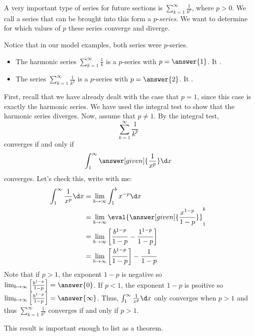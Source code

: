 \documentclass{ximera}
\begin{document}
A very important type of series for future sections is $\sum_{k=1}^\infty \frac{1}{k^p}$, where $p>0$.  We call a series that can be brought into this form a $p$-\emph{series}.  We want to determine for which values of $p$ these series converge and diverge.

Notice that in our model examples, both series were $p$-series.

\begin{itemize}
\item The harmonic series $\sum_{k=1}^{\infty} \frac{1}{k}$ is a $p$-series with $p = \answer{1}$.  It .
\item The series $\sum_{k=1}^{\infty} \frac{1}{k^2}$ is a $p$-series with $p = \answer{2}$. It .
\end{itemize}
  
 \begin{explanation}
    First, recall that we have already dealt with the case that $p = 1$, since 
    this case is exactly the harmonic series.  We have used the integral test 
    to show that the harmonic series diverges.
    Now, assume that $p \ne 1$.  By the integral test,
    \[
    \sum_{k=1}^\infty \frac{1}{k^p}
    \]
    converges if and only if
    \[
    \int_1^\infty \answer[given]{\frac{1}{x^p}} \d x
    \]
    converges. Let's check this, write with me:
    \begin{align*}
      \int_1^\infty \frac{1}{x^p} \d x &= \lim_{b\to\infty} \int_1^b x^{-p} \d x\\
      &= \lim_{b\to\infty} \eval{\answer[given]{\frac{x^{1-p}}{1-p}}}_1^b\\
      &= \lim_{b\to\infty} \left[ \frac{b^{1-p}}{1-p} - \frac{1^{1-p}}{1-p} \right] \\
      &= \lim_{b\to\infty} \left[\frac{b^{1-p}}{1-p}\right] - \frac{1}{1-p}
    \end{align*}
Note that if $p >1$, the exponent $1-p$ is negative so $ \lim_{b\to\infty} \left[\frac{b^{1-p}}{1-p}\right] = \answer{0}$.   If $p <1$, the exponent $1-p$ is psoitive so $ \lim_{b\to\infty} \left[\frac{b^{1-p}}{1-p}\right] = \answer{\infty}$.  Thus, $  \int_1^\infty \frac{1}{x^p} \d x$  only converges when $p>1$ and thus  $\sum_{k=1}^\infty \frac{1}{k^p}$ converges if and only if $p>1$.
  \end{explanation}

This result is important enough to list as a theorem.
\end{document}
